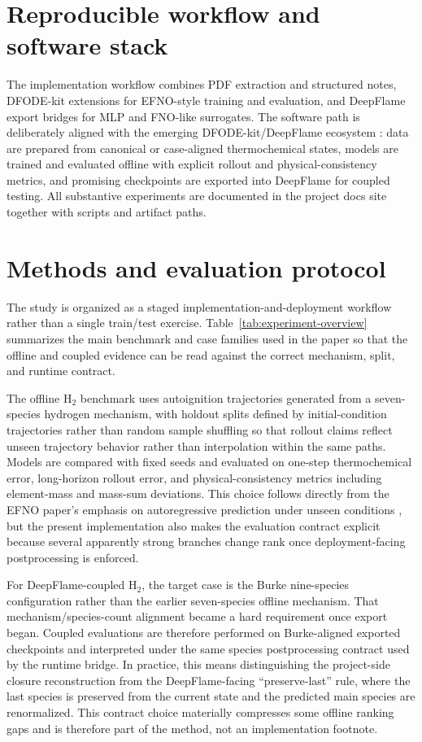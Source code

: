 \documentclass[11pt]{article}
\begin{document}
\section{Reproducible workflow and software stack}
The implementation workflow combines PDF extraction and structured notes, DFODE-kit extensions for EFNO-style training and evaluation, and DeepFlame export bridges for MLP and FNO-like surrogates. The software path is deliberately aligned with the emerging DFODE-kit/DeepFlame ecosystem \cite{li2026dfodekit,li2025comprehensive}: data are prepared from canonical or case-aligned thermochemical states, models are trained and evaluated offline with explicit rollout and physical-consistency metrics, and promising checkpoints are exported into DeepFlame for coupled testing. All substantive experiments are documented in the project docs site together with scripts and artifact paths.

\section{Methods and evaluation protocol}
The study is organized as a staged implementation-and-deployment workflow rather than a single train/test exercise. Table~\ref{tab:experiment-overview} summarizes the main benchmark and case families used in the paper so that the offline and coupled evidence can be read against the correct mechanism, split, and runtime contract.



The offline H$_2$ benchmark uses autoignition trajectories generated from a seven-species hydrogen mechanism, with holdout splits defined by initial-condition trajectories rather than random sample shuffling so that rollout claims reflect unseen trajectory behavior rather than interpolation within the same paths. Models are compared with fixed seeds and evaluated on one-step thermochemical error, long-horizon rollout error, and physical-consistency metrics including element-mass and mass-sum deviations. This choice follows directly from the EFNO paper's emphasis on autoregressive prediction under unseen conditions \cite{weng2025efno}, but the present implementation also makes the evaluation contract explicit because several apparently strong branches change rank once deployment-facing postprocessing is enforced.

For DeepFlame-coupled H$_2$, the target case is the Burke nine-species configuration rather than the earlier seven-species offline mechanism. That mechanism/species-count alignment became a hard requirement once export began. Coupled evaluations are therefore performed on Burke-aligned exported checkpoints and interpreted under the same species postprocessing contract used by the runtime bridge. In practice, this means distinguishing the project-side closure reconstruction from the DeepFlame-facing ``preserve-last'' rule, where the last species is preserved from the current state and the predicted main species are renormalized. This contract choice materially compresses some offline ranking gaps and is therefore part of the method, not an implementation footnote.
\end{document}
